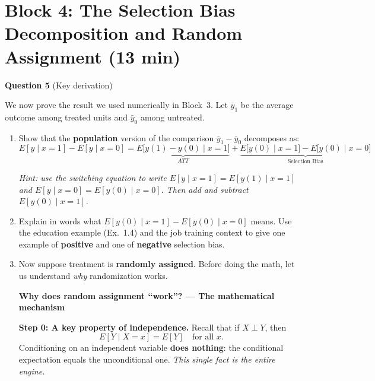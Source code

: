 \documentclass[11pt,a4paper]{article}
\begin{document}
\section{Block 4: The Selection Bias Decomposition and Random Assignment \textnormal{(13 min)}}

\textbf{Question 5} (Key derivation)

\medskip
We now prove the result we used numerically in Block~3. Let $\bar{y}_1$ be the average outcome among treated units and $\bar{y}_0$ among untreated.

\begin{enumerate}[label=(\alph*)]
\item Show that the \textbf{population} version of the comparison $\bar{y}_1 - \bar{y}_0$ decomposes as:
\[
  E[y \mid x{=}1] - E[y \mid x{=}0]
  = \underbrace{E\bigl[y(1) - y(0) \mid x{=}1\bigr]}_{ATT}
  + \underbrace{E\bigl[y(0) \mid x{=}1\bigr] - E\bigl[y(0) \mid x{=}0\bigr]}_{\text{Selection Bias}}
\]

\textcolor{hintcolor}{\emph{Hint: use the switching equation to write $E[y \mid x{=}1] = E[y(1) \mid x{=}1]$ and $E[y \mid x{=}0] = E[y(0) \mid x{=}0]$. Then add and subtract $E[y(0) \mid x{=}1]$.}}

\begin{answerbox}
\vspace{7cm}
\end{answerbox}

\newpage
\item Explain in words what $E[y(0) \mid x{=}1] - E[y(0) \mid x{=}0]$ means. Use the education example (Ex.~1.4) and the job training context to give one example of \textbf{positive} and one of \textbf{negative} selection bias.

\begin{answerbox}
\vspace{5cm}
\end{answerbox}

\item Now suppose treatment is \textbf{randomly assigned}. Before doing the math, let us understand \emph{why} randomization works.

\begin{bookexample}
\textbf{\color{blockcolor}Why does random assignment ``work''? --- The mathematical mechanism}

\smallskip
\textbf{Step 0: A key property of independence.} Recall that if $X \perp Y$, then
\[
  E[Y \mid X = x] = E[Y] \quad \text{for all } x.
\]
Conditioning on an independent variable \textbf{does nothing}: the conditional expectation equals the unconditional one. \emph{This single fact is the entire engine.}


\end{bookexample}
\end{enumerate}
\end{document}
